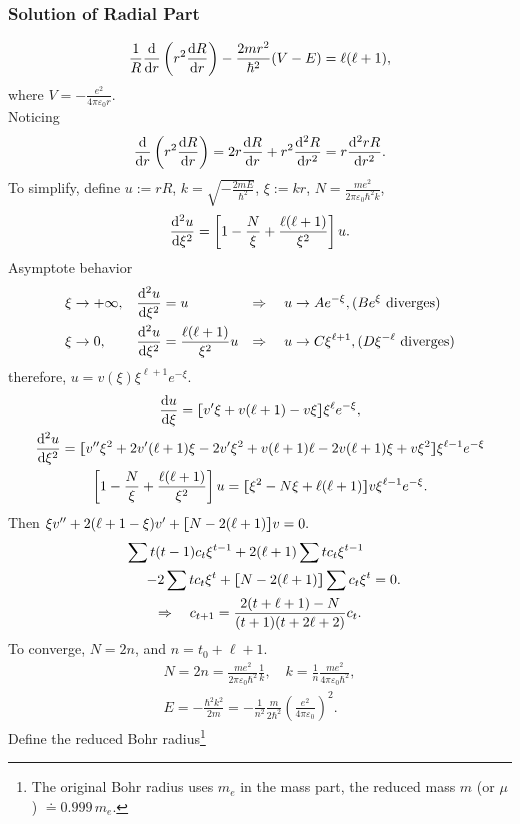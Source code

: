 \documentclass{article}
\def\d{{\rm d}}
\newcommand{\ko}[1]{\hspace{-#1 pt}}%
\newcommand{\ds}[2]{\frac{\d #1}{\d #2}}%
\newcommand{\sds}[2]{\frac{\d^2 #1}{\d #2^2}}
\newcommand{\kh}[1]{\left(#1\right)}
\newcommand{\cmm}[1]{\lfloor\ko{4.45}\lceil #1\rceil\ko{4.45}\rfloor}%
\begin{document}
\subsubsection{Solution of Radial Part}
$$\frac1R\ds{}r\kh{r^2\ds Rr}-\frac{2mr^2}{\hbar^2}(V-E)=\ell(\ell+1),$$
where $V=-\frac{e^2}{4\pi\varepsilon_0r}$.\\
Noticing
$$\ds{}r\kh{r^2\ds Rr}=2r\ds Rr+r^2\sds Rr=r\sds{rR}r.$$
To simplify, define $u:=rR$, $k=\sqrt{-\frac{2mE}{\hbar^2}}$, $\xi:=kr$, $N=\frac{me^2}{2\pi\varepsilon_0\hbar^2k}$,
\begin{align}\label{radeqn}
	\sds u\xi=\left[1-\frac N\xi+\frac{\ell(\ell+1)}{\xi^2}\right]u.
\end{align}
Asymptote behavior
\begin{align*}
	\xi & \to+\infty, & \sds u\xi & =u                           & \Rightarrow\quad u & \to Ae^{-\xi},(Be^\xi{\rm~diverges})           \\
	\xi & \to0,       & \sds u\xi & =\frac{\ell(\ell+1)}{\xi^2}u & \Rightarrow\quad u & \to C\xi^{\ell+1},(D\xi^{-\ell}{\rm~diverges})
\end{align*}
therefore, $u=v(\xi)\xi^{\ell+1}e^{-\xi}.$
\begin{gather*}
	\ds u\xi=\cmm{v'\xi+v(\ell+1)-v\xi}\xi^\ell e^{-\xi},\\
	\sds u\xi=\cmm{v''\xi^2+2v'(\ell+1)\xi-2v'\xi^2+v(\ell+1)\ell-2v(\ell+1)\xi+v\xi^2}\xi^{\ell-1}e^{-\xi}\\
	\left[1-\frac N\xi+\frac{\ell(\ell+1)}{\xi^2}\right]u=\cmm{\xi^2-N\xi+\ell(\ell+1)}v\xi^{\ell-1}e^{-\xi}.
\end{gather*}
Then $\xi v''+2(\ell+1-\xi)v'+\cmm{N-2(\ell+1)}v=0.$
\begin{gather*}
	\sum t(t-1)c_t\xi^{t-1}+2(\ell+1)\sum tc_t\xi^{t-1}\qquad\\
	\qquad-2\sum tc_t\xi^t+\cmm{N-2(\ell+1)}\sum c_t\xi^t=0.\\
	\Rightarrow\quad c_{t+1}=\frac{2(t+\ell+1)-N}{(t+1)(t+2\ell+2)}c_t.
\end{gather*}
To converge, $N=2n$, and $n=t_0+\ell+1$.
\begin{gather*}
	N=2n=\frac{me^2}{2\pi\varepsilon_0\hbar^2}\frac1k,\quad
	k=\frac1n\frac{me^2}{4\pi\varepsilon_0\hbar^2},\\
	E=-\frac{\hbar^2k^2}{2m}=-\frac1{n^2}\frac m{2\hbar^2}\left(\frac{e^2}{4\pi\varepsilon_0}\right)^2.
\end{gather*}
Define the reduced Bohr radius\footnote{The original Bohr radius uses $m_e$ in the mass part, the reduced mass $m$ (or $\mu$) $\doteq 0.999\,m_e$.}
\end{document}
